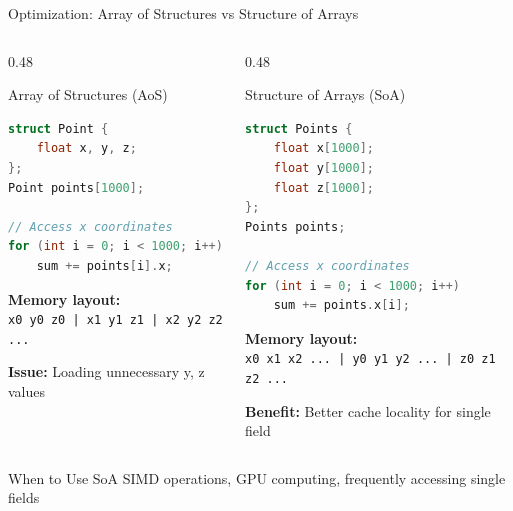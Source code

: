 \documentclass[aspectratio=169,xcolor=dvipsnames]{beamer}
\begin{document}
\begin{frame}[fragile]{Optimization: Array of Structures vs Structure of Arrays}
  \begin{columns}
    \begin{column}{0.48\textwidth}
      \begin{block}{Array of Structures (AoS)}
        \begin{lstlisting}[language=C++,basicstyle=\tiny\ttfamily]
struct Point {
    float x, y, z;
};
Point points[1000];

// Access x coordinates
for (int i = 0; i < 1000; i++)
    sum += points[i].x;
        \end{lstlisting}

        \vspace{0.2cm}

        \textbf{Memory layout:} \\
        \texttt{x0 y0 z0 | x1 y1 z1 | x2 y2 z2 ...}

        \vspace{0.2cm}

        \textbf{Issue:} Loading unnecessary y, z values
      \end{block}
    \end{column}
    \begin{column}{0.48\textwidth}
      \begin{block}{Structure of Arrays (SoA)}
        \begin{lstlisting}[language=C++,basicstyle=\tiny\ttfamily]
struct Points {
    float x[1000];
    float y[1000];
    float z[1000];
};
Points points;

// Access x coordinates
for (int i = 0; i < 1000; i++)
    sum += points.x[i];
        \end{lstlisting}

        \vspace{0.2cm}

        \textbf{Memory layout:} \\
        \texttt{x0 x1 x2 ... | y0 y1 y2 ... | z0 z1 z2 ...}

        \vspace{0.2cm}

        \textbf{Benefit:} Better cache locality for single field
      \end{block}
    \end{column}
  \end{columns}

  \vspace{0.3cm}

  \begin{exampleblock}{When to Use SoA}
    SIMD operations, GPU computing, frequently accessing single fields
  \end{exampleblock}
\end{frame}
\end{document}
